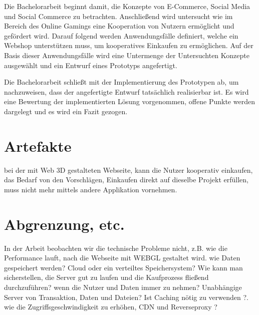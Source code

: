 Die Bachelorarbeit beginnt damit, die Konzepte von E-Commerce, Social Media und Social Commerce zu betrachten. Anschließend wird untersucht wie im Bereich des Online Gamings eine Kooperation von Nutzern ermöglicht und gefördert wird. Darauf folgend werden Anwendungsfälle definiert, welche ein Webshop unterstützen muss, um kooperatives Einkaufen zu ermöglichen. Auf der Basis dieser Anwendungsfälle wird eine Untermenge der Untersuchten Konzepte ausgewählt und ein Entwurf eines Prototyps angefertigt.

Die Bachelorarbeit schließt mit der Implementierung des Prototypen ab, um nachzuweisen, dass der angefertigte Entwurf tatsächlich realisierbar ist. Es wird eine Bewertung der implementierten Lösung vorgenommen, offene Punkte werden dargelegt und es wird ein Fazit gezogen.


\section{Artefakte}

bei der mit Web 3D gestalteten Webseite, kann die Nutzer kooperativ einkaufen, das Bedarf von den Vorschlägen, Einkaufen direkt auf dieselbe Projekt erfüllen, muss nicht mehr mittels andere Applikation vornehmen.


\section{Abgrenzung, etc.}

In der Arbeit beobachten wir die technische Probleme nicht, z.B. wie die Performance lauft, nach die Webseite mit WEBGL gestaltet wird. wie Daten gespeichert werden? Cloud oder ein verteiltes Speichersystem? Wie kann man sicherstellen, die Server gut zu laufen und die Kaufprozess fließend durchzuführen? wenn die Nutzer und Daten immer zu nehmen? Unabhängige Server von Transaktion, Daten und Dateien? Ist Caching nötig zu verwenden ?. wie die Zugriffsgeschwindigkeit zu erhöhen, CDN und Reverseproxy ?
